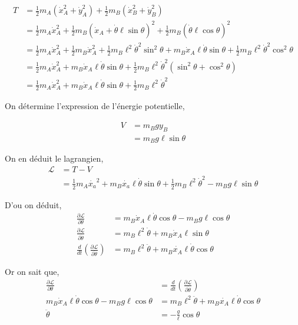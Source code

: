 \documentclass[10pt]{article}
\renewcommand{\delta}{\partial}
\begin{document}
\begin{align*}
T &= \frac{1}{2}m_A(\dot{x}_A ^2 + \dot{y}_A ^2) + \frac{1}{2}m_B(\dot{x}_B ^2 + \dot{y}_B ^2) \\
 &= \frac{1}{2}m_A\dot{x}_A ^2 + \frac{1}{2}m_B(\dot{x}_A+\dot{\theta}\ell\sin{\theta})^2 + \frac{1}{2}m_B(\dot{\theta}\ell\cos{\theta})^2 \\
 &= \frac{1}{2}m_A\dot{x}_A ^2 + \frac{1}{2}m_B\dot{x}_A ^2
 + \frac{1}{2}m_B \ell^2\dot{\theta}^2\sin^2{\theta} + m_B\dot{x}_A\ell\dot{\theta}\sin{\theta} 
 + \frac{1}{2}m_B\ell^2\dot{\theta}^2 \cos^2{\theta} \\
 &= \frac{1}{2}m_A\dot{x}_A ^2 + m_B\dot{x}_A\ell\dot{\theta}\sin{\theta}
 + \frac{1}{2}m_B \ell^2\dot{\theta}^2(\sin^2{\theta} + \cos^2{\theta}) \\
 &= \frac{1}{2}m_A\dot{x}_A ^2 + m_B\dot{x}_A\ell\dot{\theta}\sin{\theta}
 + \frac{1}{2}m_B \ell^2\dot{\theta}^2
\end{align*}

On détermine l'expression de l'énergie potentielle,

\begin{align*}
V &=m_Bgy_B \\
  &=m_Bg\ell\sin{\theta}
\end{align*}

On en déduit le lagrangien,
\begin{align*}
\mathcal{L} &= T - V \\
 &= \frac{1}{2}m_A\dot{x_a}^2 + m_B\dot{x_a}\ell\dot{\theta}\sin{\theta}
 + \frac{1}{2}m_B \ell^2\dot{\theta}^2 -  m_Bg\ell\sin{\theta}
\end{align*}

D'ou on déduit,
\begin{align*}
 \frac{\delta \mathcal{L}}{\delta\theta} &= m_B\dot{x}_A\ell\dot{\theta}\cos{\theta}-m_Bg\ell\cos{\theta} \\
 \frac{\delta \mathcal{L}}{\delta \dot{\theta}} &= m_B\ell^2\dot{\theta} + m_B\dot{x}_A\ell\sin{\theta} \\
 \frac{d}{dt}\left(\frac{\delta \mathcal{L}}{\delta \dot{\theta}}\right) &= m_B\ell^2\ddot{\theta}+m_B\dot{x_A}\ell\dot{\theta}\cos{\theta} 
\end{align*}

Or on sait que,
\begin{align*}
  \frac{\delta \mathcal{L}}{\delta\theta} &= \frac{d}{dt}\left(\frac{\delta \mathcal{L}}{\delta \dot{\theta}}\right) \\
  m_B\dot{x}_A\ell\dot{\theta}\cos{\theta}-m_Bg\ell\cos{\theta} &=  m_B\ell^2\ddot{\theta}+m_B\dot{x_A}\ell\dot{\theta}\cos{\theta}  \\
  \ddot{\theta} &= -\frac{g}{\ell}\cos{\theta}
\end{align*}
\end{document}
